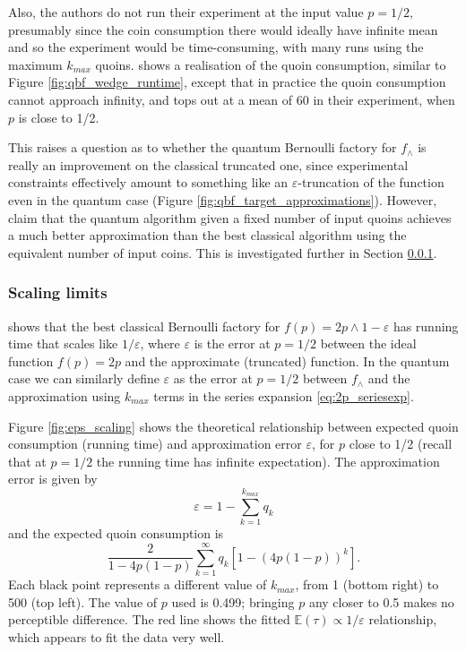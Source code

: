 \documentclass{article}
\theoremstyle{definition}
\newcommand{\E}{\mathbb{E}}
\begin{document}
Also, the authors do not run their experiment at the input value $p=1/2$, presumably since the coin consumption there would ideally have infinite mean and so the experiment would be time-consuming, with many runs using the maximum $k_{max}$ quoins.
\citet[Figure 3e]{patel2018} shows a realisation of the quoin consumption, similar to Figure \ref{fig:qbf_wedge_runtime}, except that in practice the quoin consumption cannot approach infinity, and tops out at a mean of 60 in their experiment, when $p$ is close to 1/2.

This raises a question as to whether the quantum Bernoulli factory for $f_\wedge$ is really an improvement on the classical truncated one, since experimental constraints effectively amount to something like an $\varepsilon$-truncation of the function even in the quantum case (Figure \ref{fig:qbf_target_approximations}).
However, \citet{patel2018} claim that the quantum algorithm given a fixed number of input quoins achieves a much better approximation than the best classical algorithm using the equivalent number of input coins. This is investigated further in Section \ref{sec:scaling}.

\subsubsection{Scaling limits}\label{sec:scaling}
\citet{huber2016} shows that the best classical Bernoulli factory for $f(p)=2p\wedge 1-\varepsilon$ has running time that scales like $1/\varepsilon$, where $\varepsilon$ is the error at $p=1/2$ between the ideal function $f(p)=2p$ and the approximate (truncated) function.
In the quantum case we can similarly define $\varepsilon$ as the error at $p=1/2$ between $f_\wedge$ and the approximation using $k_{max}$ terms in the series expansion \eqref{eq:2p_seriesexp}.

Figure \ref{fig:eps_scaling} shows the theoretical relationship between expected quoin consumption (running time) and approximation error $\varepsilon$, for $p$ close to 1/2 (recall that at $p=1/2$ the running time has infinite expectation).
The approximation error is given by
\begin{equation*}
\varepsilon = 1 - \sum_{k=1}^{k_{max}} q_k
\end{equation*}
and the expected quoin consumption is
\begin{equation*}
\frac{2}{1-4p(1-p)} \sum_{k=1}^\infty q_k [1-(4p(1-p))^k].
\end{equation*}
Each black point represents a different value of $k_{max}$, from 1 (bottom right) to 500 (top left). The value of $p$ used is 0.499; bringing $p$ any closer to 0.5 makes no perceptible difference. The red line shows the fitted $\E(\tau) \propto 1/\varepsilon$ relationship, which appears to fit the data very well.
\end{document}
